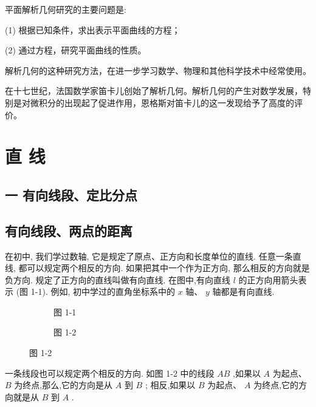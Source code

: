 \documentclass[lang=cn,newtx,12pt,scheme=chinese]{elegantbook}
\begin{document}
平面解析几何研究的主要问题是:

(1) 根据已知条件，求出表示平面曲线的方程；

(2) 通过方程，研究平面曲线的性质。

解析几何的这种研究方法，在进一步学习数学、物理和其他科学技术中经常使用。

在十七世纪，法国数学家笛卡儿创始了解析几何。解析几何的产生对数学发展，特别是对微积分的出现起了促进作用，恩格斯对笛卡儿的这一发现给予了高度的评价。

\chapter{直 线}

\section*{一 \text{ }有向线段、定比分点}

\section{有向线段、两点的距离}

在初中, 我们学过数轴, 它是规定了原点、正方向和长度单位的直线. 任意一条直线, 都可以规定两个相反的方向. 如果把其中一个作为正方向, 那么相反的方向就是负方向. 规定了正方向的直线叫做有向直线. 在图中,有向直线 \(l\) 的正方向用箭头表示 (图 1-1). 例如, 初中学过的直角坐标系中的 \(x\) 轴、 \(y\) 轴都是有向直线.

\begin{figure}[h]
  \centering
  \begin{subfigure}[h]{0.45\textwidth}
  	\centering
  	
  	\caption{图 1-1}
  \end{subfigure}
		\hfill %
  \begin{subfigure}[h]{0.45\textwidth}
  \centering
  
  \caption{图 1-2}
  \end{subfigure}
\end{figure}

一条线段也可以规定两个相反的方向. 如图 1-2 中的线段 \({AB}\) ,如果以 \(A\) 为起点、 \(B\) 为终点,那么,它的方向是从 \(A\) 到 \(B\) ; 相反,如果以 \(B\) 为起点、 \(A\) 为终点,它的方向就是从 \(B\) 到 \(A\) . 
\end{document}
